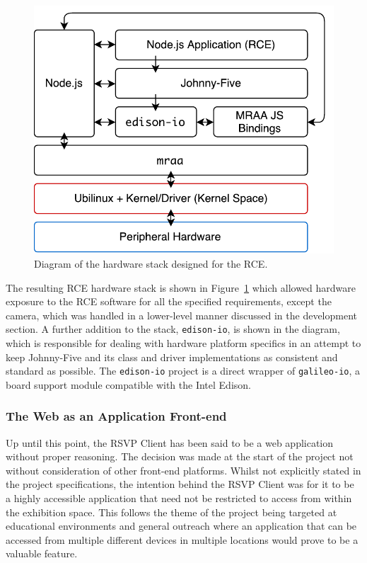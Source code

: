       \begin{figure}[h!]
        \centering
        \includegraphics[width=0.5\linewidth]{figures/softDesign-rceHardwarePlatformStack}
        \caption[Diagram of the hardware stack designed for the RCE.]{Diagram of the hardware stack designed for the RCE.}
        \label{fig:softDesign-rceHardwarePlatformStack}
      \end{figure}
      
      The resulting RCE hardware stack is shown in Figure~\ref{fig:softDesign-rceHardwarePlatformStack} which allowed hardware exposure to the RCE software for all the specified requirements, except the camera, which was handled in a lower-level manner discussed in the development section. A further addition to the stack, \texttt{edison-io}, is shown in the diagram, which is responsible for dealing with hardware platform specifics in an attempt to keep Johnny-Five and its class and driver implementations as consistent and standard as possible. The \texttt{edison-io} project is a direct wrapper of \texttt{galileo-io}, a board support module compatible with the Intel Edison.
      
    \subsubsection{The Web as an Application Front-end}
    \label{subsubsec:applicationFrontend}
      Up until this point, the RSVP Client has been said to be a web application without proper reasoning. The decision was made at the start of the project not without consideration of other front-end platforms. Whilst not explicitly stated in the project specifications, the intention behind the RSVP Client was for it to be a highly accessible application that need not be restricted to access from within the exhibition space. This follows the theme of the project being targeted at educational environments and general outreach where an application that can be accessed from multiple different devices in multiple locations would prove to be a valuable feature.
      

